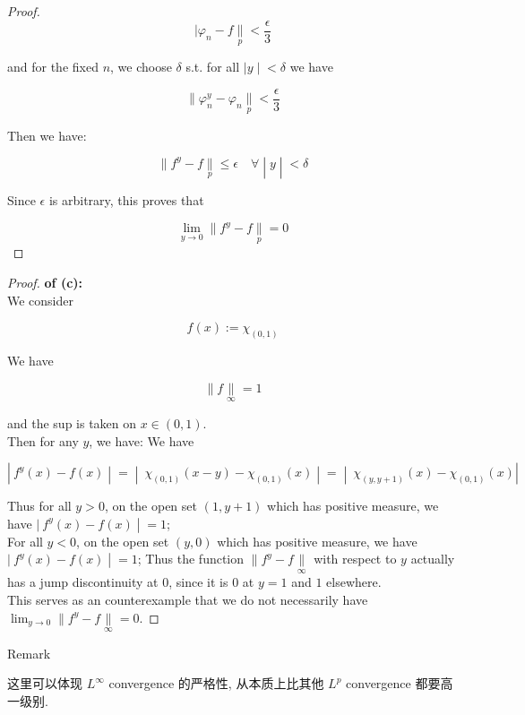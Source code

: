 \documentclass{qlnotes-export}
\begin{document}
\begin{proof}
\[|\varphi_{n} - f\underset{p}{\parallel} < \frac{\epsilon}{3}\]

and for the fixed \(n\), we choose \(\delta\) s.t. for all \(\left. |y \middle| < \delta \right.\) we have

\[\parallel \varphi_{n}^{y} - \varphi_{n}\underset{p}{\parallel} < \frac{\epsilon}{3}\]

Then we have:

\[\left. \parallel f^{y} - f\underset{p}{\parallel} \leq \epsilon\quad\forall \middle| y \middle| < \delta \right.\]

Since \(\epsilon\) is arbitrary, this proves that

\[\lim\limits_{y\rightarrow 0} \parallel f^{y} - f\underset{p}{\parallel} = 0\]

\end{proof}

\begin{proof}

\textbf{of (c):}\\

We consider

\[f(x) := \chi_{(0,1)}\]

We have

\[\parallel f\underset{\infty}{\parallel} = 1\]

and the sup is taken on \(x \in (0,1)\).\\
Then for any \(y\), we have: We have

\[\left. |\ f^{y}(x) - f(x) \middle| = \middle| \ \chi_{(0,1)}(x - y) - \chi_{(0,1)}(x) \middle| = \middle| \ \chi_{(y,y + 1)}(x) - \chi_{(0,1)}(x)| \right.\]

Thus for all \(y > 0\), on the open set \((1,y + 1)\) which has positive measure, we have \(\left. |\ f^{y}(x) - f(x) \middle| = 1 \right.\);\\
For all \(y < 0\), on the open set \((y,0)\) which has positive measure, we have \(\left. |\ f^{y}(x) - f(x) \middle| = 1 \right.\); Thus the function \(\parallel f^{y} - f\underset{\infty}{\parallel}\) with respect to \(y\) actually has a jump discontinuity at \(0\), since it is \(0\) at \(y = 1\) and \(1\) elsewhere.\\
This serves as an counterexample that we do not necessarily have \(\lim_{y\rightarrow 0} \parallel f^{y} - f\underset{\infty}{\parallel} = 0\).

\end{proof}

\begin{qlremark}{Remark}

这里可以体现 \(L^{\infty}\) convergence 的严格性, 从本质上比其他 \(L^{p}\) convergence 都要高一级别.

\end{qlremark}
\end{document}
